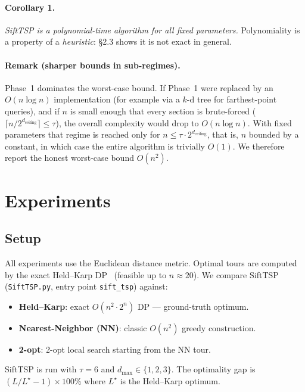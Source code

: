 \documentclass[11pt,a4paper]{article}
\begin{document}
\paragraph{Corollary 1.} \textit{SiftTSP is a polynomial-time algorithm
for all fixed parameters.} Polynomiality is a property of a
\emph{heuristic}: \S2.3 shows it is not exact in general.

\paragraph{Remark (sharper bounds in sub-regimes).} Phase~1 dominates
the worst-case bound. If Phase~1 were replaced by an $O(n \log n)$
implementation (for example via a $k$-d tree for farthest-point
queries), and if $n$ is small enough that every section is brute-forced
($\lceil n / 2^{d_{\text{ceiling}}} \rceil \leq \tau$), the overall
complexity would drop to $O(n \log n)$. With fixed parameters that
regime is reached only for $n \leq \tau \cdot 2^{d_{\text{ceiling}}}$,
that is, $n$ bounded by a constant, in which case the entire algorithm
is trivially $O(1)$. We therefore report the honest worst-case bound
$O(n^2)$.

\section{Experiments}

\subsection{Setup}

All experiments use the Euclidean distance metric. Optimal tours are
computed by the exact Held--Karp DP~\cite{heldkarp1962} (feasible up to $n \approx 20$).
We compare SiftTSP (\texttt{SiftTSP.py}, entry point \texttt{sift\_tsp})
against:

\begin{itemize}
\item \textbf{Held--Karp}: exact $O(n^2 \cdot 2^n)$ DP --- ground-truth
optimum.
\item \textbf{Nearest-Neighbor (NN)}: classic $O(n^2)$ greedy
construction.
\item \textbf{2-opt}: 2-opt local search starting from the NN tour.
\end{itemize}

SiftTSP is run with $\tau = 6$ and $d_{\max} \in \{1, 2, 3\}$. The
optimality gap is $(L / L^{\star} - 1) \times 100\%$ where $L^{\star}$ is
the Held--Karp optimum.
\end{document}
